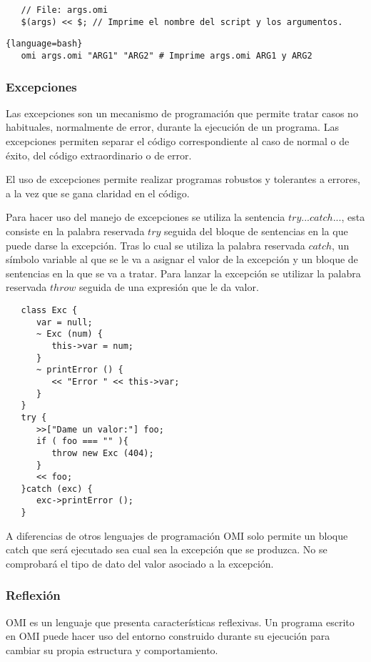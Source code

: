  \begin{lstlisting}
   // File: args.omi
   $(args) << $; // Imprime el nombre del script y los argumentos.
\end{lstlisting}

 \begin{lstlisting}{language=bash}
   omi args.omi "ARG1" "ARG2" # Imprime args.omi ARG1 y ARG2
\end{lstlisting}

\subsubsection{Excepciones} \label{sec:exception}

Las excepciones son un mecanismo de programación que permite tratar casos no habituales, normalmente de error, durante la ejecución de un programa. Las excepciones
permiten separar el código correspondiente al caso de normal o de éxito, del código extraordinario o de error. 

El uso de excepciones permite realizar programas robustos y tolerantes a errores, a la vez que se gana claridad en el código.

Para hacer uso del manejo de excepciones se utiliza la sentencia $try...catch...$, esta consiste en la palabra reservada $try$ seguida del bloque de 
sentencias en la que puede darse la excepción. Tras lo cual se utiliza la palabra reservada $catch$, un símbolo variable al que se le va a asignar el valor de la excepción y un bloque de 
sentencias en la que se va a tratar. Para lanzar la excepción se utilizar la palabra reservada $throw$ seguida de una expresión que le da valor. \\

\begin{lstlisting}
   class Exc {
      var = null;
      ~ Exc (num) {
         this->var = num;
      }
      ~ printError () {
         << "Error " << this->var;
      }
   }
   try {
      >>["Dame un valor:"] foo;
      if ( foo === "" ){
         throw new Exc (404);
      } 
      << foo;
   }catch (exc) {
      exc->printError ();
   }
\end{lstlisting}

A diferencias de otros lenguajes de programación OMI solo permite un bloque catch que será ejecutado sea cual sea la excepción que se produzca. No se comprobará el 
tipo de dato del valor asociado a la excepción. 

\subsubsection{Reflexión}
OMI es un lenguaje que presenta características reflexivas. Un programa escrito en OMI puede hacer uso del entorno construido durante su ejecución para cambiar su propia estructura
y comportamiento.

